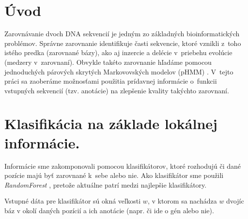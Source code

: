 \documentclass[myposter,portrait]{sciposter}
\def\mysection#1{
{\color{SectionCol}\section*{\sc\bfseries #1}}}
\begin{document}
\begin{multicols*}{3}


\mysection{Úvod}

Zarovnávanie dvoch DNA sekvencií je jedným zo základných
bioinformatických problémov. Správne zarovnanie identifikuje časti
sekvencie, ktoré vznikli z~toho istého predka (zarovnané bázy), ako aj
inzercie a delécie v~priebehu evolúcie (medzery v~zarovnaní). Obvykle
takéto zarovnanie hľadáme pomocou jednoduchých párových skrytých
Markovovských modelov (pHMM) \cite{durbin}. V~tejto práci sa zaoberáme
možnosťami použitia prídavnej informácie o~funkcii vstupných sekvencií
(tzv. anotácie) na zlepšenie kvality takýchto zarovnaní.


\mysection{Klasifikácia na základe lokálnej informácie.}

Informácie sme zakomponovali pomocou klasifikátorov, ktoré rozhodujú či dané pozície majú byť zarovnané k~sebe alebo nie. Ako klasifikátor sme použili \emph{RandomForest} \cite{randomForestPaper}, pretože aktuálne patrí medzi najlepšie klasifikátory.

Vstupné dáta pre klasifikátor sú okná veľkosti $w$, v ktorom sa nachádza $w$ dvojíc báz v okolí daných pozícií a ich anotácie (napr. či ide o gén alebo nie).


\end{multicols*}
\end{document}
